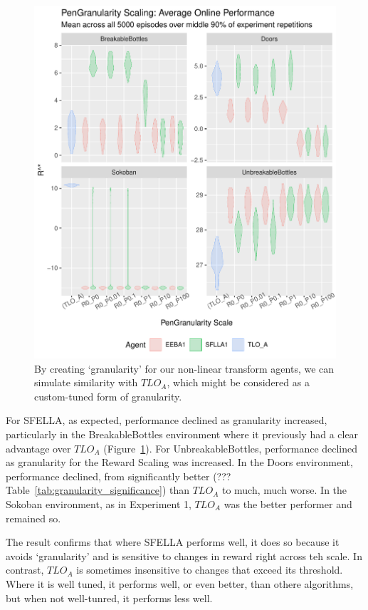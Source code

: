 \begin{figure}
  \includegraphics[width=\columnwidth]{output/multirun_n100_pilot_granularityonline_PenGranularity.pdf}
  \caption{By creating `granularity' for our non-linear transform agents, we can simulate similarity with $TLO_A$, which might be considered as a custom-tuned form of granularity.
  }
   \label{fig:exp3_main}
 \end{figure}
 
For SFELLA, as expected, performance declined as granularity increased, particularly in the BreakableBottles environment where it previously had a clear advantage over $TLO_A$ (Figure~\ref{fig:exp3_main}). For UnbreakableBottles, performance declined as granularity for the Reward Scaling was increased. In the Doors environment, performance declined, from significantly better (??? Table~\ref{tab:granularity_significance}) than $TLO_A$ to much, much worse. In the Sokoban environment, as in Experiment 1, $TLO_A$ was the better performer and remained so.

The result confirms that where SFELLA performs well, it does so because it avoids `granularity' and is sensitive to changes in reward right across teh scale. In contrast, $TLO_A$ is sometimes insensitive to changes that exceed its threshold. Where it is well tuned, it performs well, or even better, than othere algorithms, but when not well-tunred, it performs less well.



